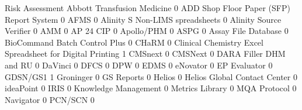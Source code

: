 \documentclass{article}
\begin{document}
\begin{Schunk}
\begin{Soutput}
                                                            Risk Assessment
  Abbott Transfusion Medicine                                             0
  ADD Shop Floor Paper (SFP) Report System                                0
  AFMS                                                                    0
  Alinity S Non-LIMS spreadsheets                                         0
  Alinity Source Verifier                                                 0
  AMM                                                                     0
  AP 24 CIP                                                               0
  Apollo/PHM                                                              0
  ASPG                                                                    0
  Assay File Database                                                     0
  BioCommand Batch Control Plus                                           0
  CHaRM                                                                   0
  Clinical Chemistry Excel Spreadsheet for Digital Printing               1
  CMSnext                                                                 0
  CMSNext                                                                 0
  DARA Filler DHM and RU                                                  0
  DaVinci                                                                 0
  DFCS                                                                    0
  DPW                                                                     0
  EDMS                                                                    0
  eNovator                                                                0
  EP Evaluator                                                            0
  GDSN/GS1                                                                1
  Groninger                                                               0
  GS Reports                                                              0
  Helios                                                                  0
  Helios Global Contact Center                                            0
  ideaPoint                                                               0
  IRIS                                                                    0
  Knowledge Management                                                    0
  Metrics Library                                                         0
  MQA Protocol                                                            0
  Navigator                                                               0
  PCN/SCN                                                                 0

\end{Soutput}
\end{Schunk}
\end{document}
